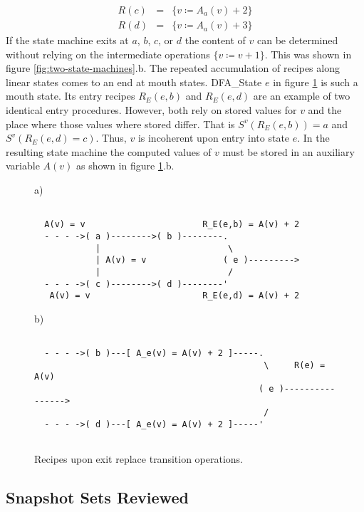 \documentclass[12pt,a4paper]{scrartcl}
\begin{document}
\begin{eqnarray}
    R(c) &=&\{ v \coloneqq  A_a(v) + 2 \} \\
    R(d) &=&\{ v \coloneqq  A_a(v) + 3 \}                                 
\end{eqnarray}
If the state machine exits at $a$, $b$, $c$, or $d$ the content of $v$ can be
determined without relying on the intermediate operations $\{ v\coloneqq v+1 \}$. This
was shown in figure \ref{fig:two-state-machines}.b. 
The repeated accumulation of recipes along linear states comes to an end at
mouth states. DFA_State $e$ in figure \ref{fig:interference-example} is such a
mouth state. Its entry recipes $R_E(e,b)$ and $R_E(e,d)$ are an example of two
identical entry procedures. However, both rely on stored values for $v$ and the
place where those values where stored differ. That is $S^v(R_E(e,b))=a$ and
$S^v(R_E(e,d)=c)$. Thus, $v$ is incoherent upon entry into state $e$.  In
the resulting state machine the computed values of $v$ must be stored in an
auxiliary variable $A(v)$ as shown in figure \ref{fig:interference-example}.b.
\begin{figure}[htbp] \leavevmode \label{fig:interference-example}
a)
\begin{verbatim}

  A(v) = v                       R_E(e,b) = A(v) + 2
  - - - ->( a )-------->( b )--------.
            |                         \
            | A(v) = v               ( e )--------->
            |                         /
  - - - ->( c )-------->( d )--------'
   A(v) = v                      R_E(e,d) = A(v) + 2

\end{verbatim}
b)
\begin{verbatim}
                                 
  - - - ->( b )---[ A_e(v) = A(v) + 2 ]-----.
                                             \     R(e) = A(v)
                                            ( e )---------------->
                                             /
  - - - ->( d )---[ A_e(v) = A(v) + 2 ]-----'
                                 

\end{verbatim}
\caption{Recipes upon exit replace transition operations.}
\end{figure}

\subsection{Snapshot Sets Reviewed}
\end{document}
